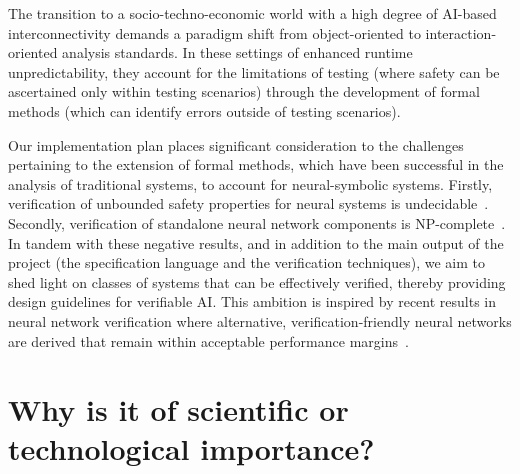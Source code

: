 \documentclass[11pt]{article}
\begin{document}
The transition to a socio-techno-economic world with a high degree of AI-based
interconnectivity demands a paradigm shift from object-oriented to
interaction-oriented analysis standards. In these settings of enhanced runtime
unpredictability, they account for the limitations of testing (where safety can
be ascertained only within testing scenarios) through the development of formal
methods (which can identify errors outside of testing scenarios).

Our implementation plan  places significant consideration to the challenges
pertaining to the extension of formal methods, which have been successful in the
analysis of traditional systems, to account for neural-symbolic systems.
Firstly, verification of unbounded safety properties for neural systems is
undecidable~\cite{Akintunde+20}. Secondly, verification of standalone neural
network components is NP-complete~\cite{Katz+17}. In tandem with these negative
results, and in addition to the main output of the project (the specification
language and the verification techniques), we aim to shed light on classes of
systems that can be effectively verified, thereby providing design guidelines
for verifiable AI. This ambition is inspired by recent results in neural network
verification where alternative, verification-friendly neural networks are derived that
remain within acceptable performance margins~\cite{baninajjarvnn}.


  


\section{Why is it of scientific or technological importance?}

\end{document}
